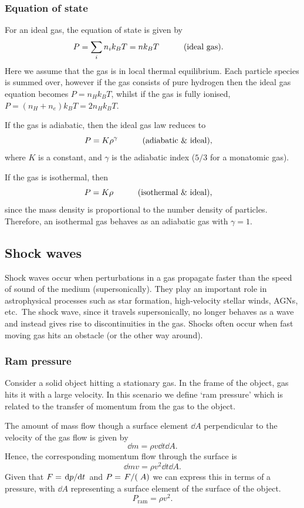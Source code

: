 \subsubsection{Equation of state}
For an ideal gas, the equation of state is given by
%
\begin{equation}
	P = \sum_{i}n_i k_B T = n k_B T \qquad \qq{(ideal gas).}
	\label{eq:AP:ideal_gas}
\end{equation}
%
Here we assume that the gas is in local thermal equilibrium.
 Each particle species is summed over, however if the gas consists of pure hydrogen then the ideal gas equation becomes \(P = n_H k_B T\), whilst if the gas is fully ionised, \(P = (n_H + n_e)k_B T = 2n_H k_B T\).
\par 
If the gas is adiabatic, then the ideal gas law reduces to
%
\begin{equation}
	P = K \rho^\gamma \qquad \qq{(adiabatic \& ideal),}
	\label{eq:AP:adiabatic_ideal_gas}
\end{equation}
%
where \(K\) is a constant, and \(\gamma\) is the adiabatic index (\(5/3\) for a monatomic gas).
\par 
If the gas is isothermal, then
%
\begin{equation}
	P = K\rho \qquad \qq{(isothermal \& ideal),}
	\label{eq:AP:isothermal_ideal_gas}
\end{equation}
%
since the mass density is proportional to the number density of particles.
 Therefore, an isothermal gas behaves as an adiabatic gas with \(\gamma = 1\).
%
%
\subsection{Shock waves}
Shock waves occur when perturbations in a gas propagate faster than the speed of sound of the medium (supersonically).
 They play an important role in astrophysical processes such as star formation, high-velocity stellar winds, AGNs, etc.\
 The shock wave, since it travels supersonically, no longer behaves as a wave and instead gives rise to discontinuities in the gas.
 Shocks often occur when fast moving gas hits an obstacle (or the other way around).
%
\subsubsection{Ram pressure}
Consider a solid object hitting a stationary gas.
 In the frame of the object, gas hits it with a large velocity.
 In this scenario we define `ram pressure' which is related to the transfer of momentum from the gas to the object.
\par 
The amount of mass flow though a surface element \(\dd{A}\) perpendicular to the velocity of the gas flow is given by
%
\[\dd{m} = \rho v \dd{t} \dd{A}.\]
%
Hence, the corresponding momentum flow through the surface is
%
\[\dd{m} v = \rho v^2 \dd{t} \dd{A}.\]
%
Given that \(F = \dv*{p}{t}\) and \(P = \flatfrac{F}(A)\) we can express this in terms of a pressure, with \(\dd{A}\) representing a surface element of the surface of the object.
%
\begin{equation}
	P_\text{ram} = \rho v^2.
	\label{eq:AP:ram_pressure}
\end{equation}
%
